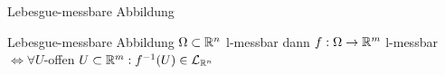 \documentclass[class=article, crop=false]{standalone}
\begin{document}
\begin{zettel}{Lebesgue-messbare Abbildung}
\begin{flashcard}[hrmgcfyt]{Lebesgue-messbare Abbildung}
	$\Omega \subset \mathbb{R}^n$ l-messbar dann $f: \Omega \to  \mathbb{R}^m$ l-messbar $\iff  \forall U$-offen $U \subset  \mathbb{R}^m : f^{-1}(U) \in  \mathcal{L}_{\mathbb{R}^n }$
\end{flashcard}
\end{zettel}
\end{document}
